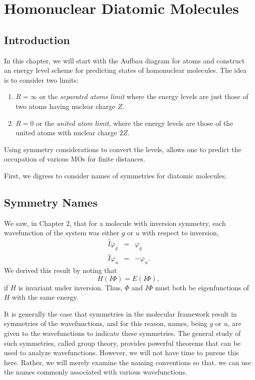 \chapter{Homonuclear Diatomic Molecules}

\section{Introduction}

In this chapter, we will start with the Aufbau diagram for atoms 
and construct an energy level scheme for predicting states of 
homonuclear molecules.  The idea is to consider two limits:
\begin{enumerate}
\item $R = \infty$ or the \emph{separated atoms limit} where the energy
levels are just those of two atoms having nuclear charge $Z$.
\item $R = 0$ or the \emph{united atom limit}, where the energy levels
are those of the united atoms with nuclear charge $2Z$.
\end{enumerate}
Using symmetry considerations to convert the levels, allows one to
predict the occupation of various MOs for finite distances.

First, we digress to consider names of symmetries for diatomic 
molecules.

\section{Symmetry Names}

We saw, in Chapter 2, that for a molecule with inversion symmetry, 
each wavefunction of the system was either $g$ or $u$ with respect to 
inversion, 
\begin{eqnarray}
{\hat{I}}\varphi_g &=& \varphi_g\\
{\hat{I}} \varphi_u &=& - \varphi_u.
\end{eqnarray}
We derived this result by noting that 
\begin{equation}
H(I\Phi) = E(I \Phi),
\end{equation}
if $H$ is invariant under inversion. Thus, $\Phi$ and $I \Phi$ must
both be eigenfunctions of $H$ with the same energy.

It is generally the case that symmetries in the molecular 
framework result in symmetries of the wavefunctions, and for 
this reason, names, being $g$ or $u$, are given to the 
wavefunctions to indicate these symmetries.  The general study 
of such symmetries, called group theory, provides powerful 
theorems that can be used to analyze wavefunctions.
However, we will not have time to pursue this here.  Rather, we will 
merely examine the naming conventions so that. we can use the names 
commonly associated with various wavefunctions.

